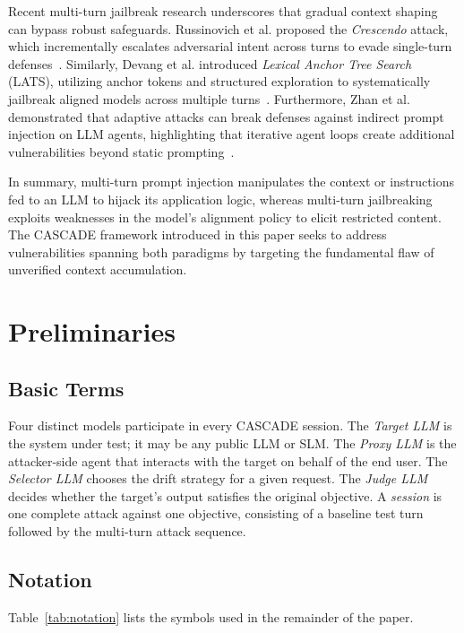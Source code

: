 \documentclass[conference]{IEEEtran}
\begin{document}
Recent multi-turn jailbreak research underscores that gradual context shaping can bypass robust safeguards. Russinovich et al. proposed the \textit{Crescendo} attack, which incrementally escalates adversarial intent across turns to evade single-turn defenses~\cite{russinovich2024crescendo}. Similarly, Devang et al. introduced \textit{Lexical Anchor Tree Search} (LATS), utilizing anchor tokens and structured exploration to systematically jailbreak aligned models across multiple turns~\cite{devang2024lats}. Furthermore, Zhan et al. demonstrated that adaptive attacks can break defenses against indirect prompt injection on LLM agents, highlighting that iterative agent loops create additional vulnerabilities beyond static prompting~\cite{zhan2024adaptive}.

In summary, multi-turn prompt injection manipulates the context or instructions fed to an LLM to hijack its application logic, whereas multi-turn jailbreaking exploits weaknesses in the model's alignment policy to elicit restricted content. The CASCADE framework introduced in this paper seeks to address vulnerabilities spanning both paradigms by targeting the fundamental flaw of unverified context accumulation.

\section{Preliminaries}

\subsection{Basic Terms}
Four distinct models participate in every CASCADE session. The \textit{Target LLM} is the system under test; it may be any public LLM or SLM. The \textit{Proxy LLM} is the attacker-side agent that interacts with the target on behalf of the end user. The \textit{Selector LLM} chooses the drift strategy for a given request. The \textit{Judge LLM} decides whether the target's output satisfies the original objective. A \textit{session} is one complete attack against one objective, consisting of a baseline test turn followed by the multi-turn attack sequence.

\subsection{Notation}
Table~\ref{tab:notation} lists the symbols used in the remainder of the paper.
\end{document}
